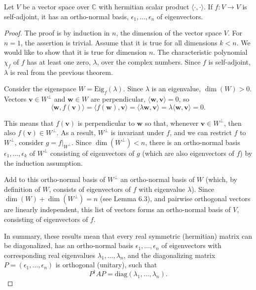 \documentclass[a4paper,12pt]{report}
\begin{document}
\begin{theorem}
Let $V$ be a vector space over $\mathbb{C}$ with hermitian scalar product $\langle \cdot, \cdot \rangle$. If $f : V \to V$ is self-adjoint, it has an ortho-normal basis, $\epsilon_1, \ldots, \epsilon_n$ of eigenvectors.
\end{theorem}

\begin{proof}
The proof is by induction in $n$, the dimension of the vector space $V$. For $n = 1$, the assertion is trivial. Assume that it is true for all dimensions $k < n$. We would like to show that it is true for dimension $n$. The characteristic polynomial $\chi_f$ of $f$ has at least one zero, $\lambda$, over the complex numbers. Since $f$ is self-adjoint, $\lambda$ is real from the previous theorem. 

Consider the eigenspace $W = \text{Eig}_f(\lambda)$. Since $\lambda$ is an eigenvalue, $\dim(W) > 0$. Vectors $\mathbf{v} \in W^\perp$ and $\mathbf{w} \in W$ are perpendicular, $\langle \mathbf{w}, \mathbf{v} \rangle = 0$, so
\begin{equation}
\langle \mathbf{w}, f(\mathbf{v}) \rangle = \langle f(\mathbf{w}), \mathbf{v} \rangle = \langle \lambda \mathbf{w}, \mathbf{v} \rangle = \lambda \langle \mathbf{w}, \mathbf{v} \rangle = 0.
\end{equation}

This means that $f(\mathbf{v})$ is perpendicular to $\mathbf{w}$ so that, whenever $\mathbf{v} \in W^\perp$, then also $f(\mathbf{v}) \in W^\perp$. As a result, $W^\perp$ is invariant under $f$, and we can restrict $f$ to $W^\perp$, \ie consider $g = f|_{W^\perp}$. Since $\dim(W^\perp) < n$, there is an ortho-normal basis $\epsilon_1, \ldots, \epsilon_k$ of $W^\perp$ consisting of eigenvectors of $g$ (which are also eigenvectors of $f$) by the induction assumption. 

Add to this ortho-normal basis of $W^\perp$ an ortho-normal basis of $W$ (which, by definition of $W$, consists of eigenvectors of $f$ with eigenvalue $\lambda$). Since $\dim(W) + \dim(W^\perp) = n$ (see Lemma 6.3), and pairwise orthogonal vectors are linearly independent, this list of vectors forms an ortho-normal basis of $V$, consisting of eigenvectors of $f$.

In summary, these results mean that every real symmetric (hermitian) matrix can be diagonalized, has an ortho-normal basis $\epsilon_1, \ldots, \epsilon_n$ of eigenvectors with corresponding real eigenvalues $\lambda_1, \ldots, \lambda_n$, and the diagonalizing matrix $P = (\epsilon_1, \ldots, \epsilon_n)$ is orthogonal (unitary), such that
\begin{equation}
P^\dagger AP = \text{diag}(\lambda_1, \ldots, \lambda_n).
\end{equation}
\end{proof}
\end{document}
